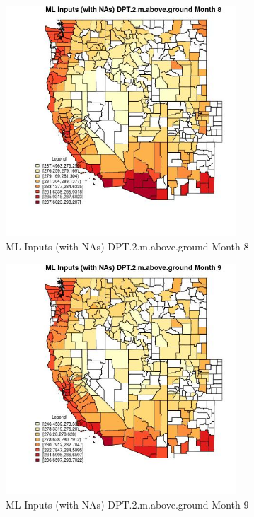 \begin{figure} 
\centering  
\includegraphics[width=0.77\textwidth]{Code_Outputs/Report_ML_input_PM25_Step4_part_f_de_duplicated_aves_prioritize_24hr_obswNAs_CountyDPT2mabovegroundmedianMonth8.jpg} 
\caption{\label{fig:Report_ML_input_PM25_Step4_part_f_de_duplicated_aves_prioritize_24hr_obswNAsCountyDPT2mabovegroundmedianMonth8}ML Inputs (with NAs) DPT.2.m.above.ground Month 8} 
\end{figure} 
 

\begin{figure} 
\centering  
\includegraphics[width=0.77\textwidth]{Code_Outputs/Report_ML_input_PM25_Step4_part_f_de_duplicated_aves_prioritize_24hr_obswNAs_CountyDPT2mabovegroundmedianMonth9.jpg} 
\caption{\label{fig:Report_ML_input_PM25_Step4_part_f_de_duplicated_aves_prioritize_24hr_obswNAsCountyDPT2mabovegroundmedianMonth9}ML Inputs (with NAs) DPT.2.m.above.ground Month 9} 
\end{figure} 
 

